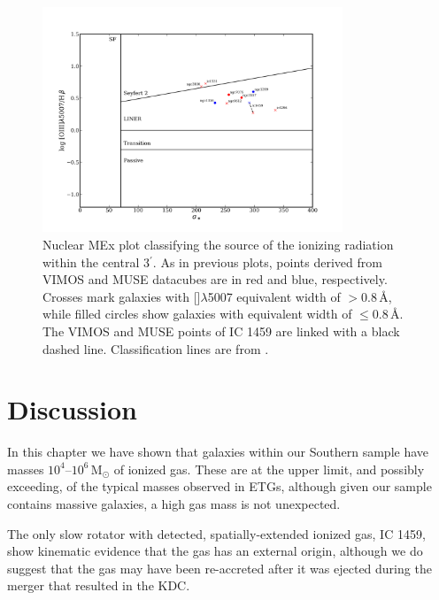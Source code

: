 		\begin{figure}
			\centering
			\includegraphics[width=0.8\textwidth]{chapter5/nuclear_MEx.png}
			\caption[Nuclear mass--excitation plot]{Nuclear MEx plot classifying the source of the ionizing radiation within the central 3$^\prime$. As in previous plots, points derived from VIMOS and MUSE datacubes are in red and blue, respectively. Crosses mark galaxies with []$\lambda$5007 equivalent width of $> 0.8$\,\AA, while filled circles show galaxies with equivalent width of $\leqslant 0.8$\,\AA. The VIMOS and MUSE points of IC 1459 are linked with a black dashed line. Classification lines are from \citet{Nyland2016}.}
			\label{fig:MEx}
		\end{figure}



\section{Discussion}
	\label{sec:discuss}
	In this chapter we have shown that galaxies within our Southern sample have masses $10^4$--$10^6\,\mathrm{M_\odot}$ of ionized gas. These are at the upper limit, and possibly exceeding, of the typical masses observed in ETGs, although given our sample contains massive galaxies, a high gas mass is not unexpected. 


	The only slow rotator with detected, spatially-extended ionized gas, IC 1459, show kinematic evidence that the gas has an external origin, although we do suggest that the gas may have been re-accreted after it was ejected during the merger that resulted in the KDC. 

